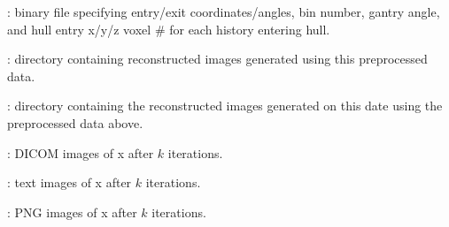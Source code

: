 \documentclass[landscape,12pt]{article}
\begin{document}
\begin{myEnumerate}[labelindent=1pt, leftmargin=*]
\begin{myEnumerate}[labelindent=1pt, leftmargin=*]
\begin{myEnumerate}[labelindent=1pt, leftmargin=*]
\begin{myEnumerate}[labelindent=1pt, leftmargin=*]
\begin{myEnumerate}[labelindent=1pt, leftmargin=*]
\begin{myEnumerate}[labelindent=1pt, leftmargin=*]
\begin{myEnumerate}[labelindent=1pt, leftmargin=*]
\begin{myEnumerate}[labelindent=1pt, leftmargin=*]
\begin{myEnumerate}[labelindent=1pt, leftmargin=*]
                                        \item {} \color{Black}: binary file specifying entry/exit coordinates/angles, bin number, gantry angle, and hull entry x/y/z voxel \# for each history entering hull.
                                        \item {} \color{Black}: directory containing reconstructed images generated using this preprocessed data.
                                        \begin{myEnumerate}[labelindent=1pt, leftmargin=*]
                                            \item {} \color{Black}: directory containing the reconstructed images generated on this date using the preprocessed data above.
                                                \begin{myEnumerate}[labelindent=1pt, leftmargin=*]
                                                    \item {} \color{Black}: DICOM images of x after $k$ iterations.
                                                    \item {} \color{Black}: text images of x after $k$ iterations.
                                                    \item {} \color{Black}: PNG images of x after $k$ iterations.
                                                \end{myEnumerate}
                                        \end{myEnumerate}
                                    \end{myEnumerate}
                                \end{myEnumerate}
                            \end{myEnumerate}
                        \end{myEnumerate}
                    \end{myEnumerate}
                \end{myEnumerate}
            \end{myEnumerate}
        \end{myEnumerate}
    \end{myEnumerate}
\baylorsection
\end{document}
